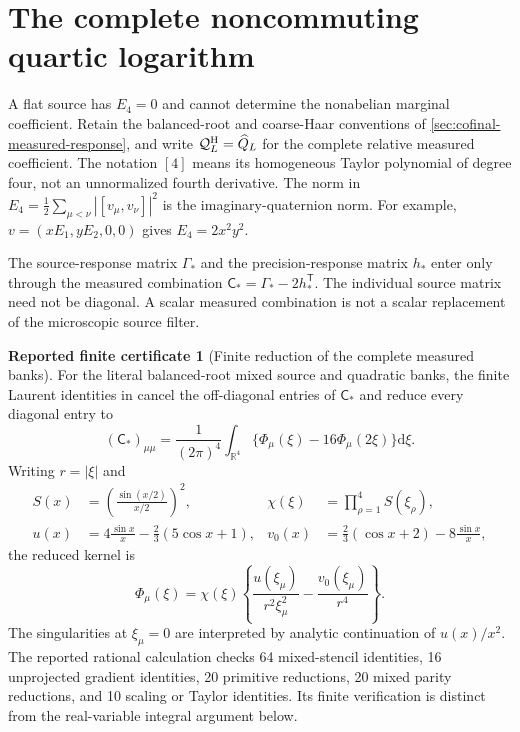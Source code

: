 \documentclass[11pt,oneside,openany]{book}
\theoremstyle{definition}
\newtheorem{certificate}[certificate]{Reported finite certificate}
\theoremstyle{remark}
\newcommand{\R}{\mathbb R}
\newcommand{\dd}{\mathrm d}
\newcommand{\src}[2]{\cite[#2]{#1}}
\begin{document}
\section{The complete noncommuting quartic logarithm}
\label{sec:measured-quartic-log}
A flat source has $E_4=0$ and cannot determine the nonabelian marginal
coefficient. Retain the balanced-root and coarse-Haar conventions of
\cref{sec:cofinal-measured-response}, and write
$\mathcal Q_L^{\rm H}=\widehat Q_L$ for the complete relative measured
coefficient. The notation $[4]$ means its homogeneous Taylor polynomial
of degree four, not an unnormalized fourth derivative. The norm in
$E_4=\tfrac12\sum_{\mu<\nu}|[v_\mu,v_\nu]|^2$ is the imaginary-quaternion
norm. For example, $v=(xE_1,yE_2,0,0)$ gives $E_4=2x^2y^2$.

The source-response matrix $\Gamma_*$ and the precision-response
matrix $h_*$ enter only through the measured combination
$\mathsf C_*=\Gamma_*-2h_*^{\mathsf T}$. The individual source matrix
need not be diagonal. A scalar measured combination is not a scalar
replacement of the microscopic source filter.

\begin{certificate}[Finite reduction of the complete measured banks]
\label{cert:measured-quartic-bank}
For the literal balanced-root mixed source and quadratic banks, the
finite Laurent identities in \src{F14}{V28--V30} cancel the
 off-diagonal entries of $\mathsf C_*$ and reduce every diagonal entry to
\begin{equation}
 (\mathsf C_*)_{\mu\mu}=
 \frac1{(2\pi)^4}\int_{\R^4}
                 \{\Phi_\mu(\xi)-16\Phi_\mu(2\xi)\}\dd\xi.
 \label{eq:quartic-flux-reduction}
\end{equation}
Writing $r=|\xi|$ and
\begin{align*}
 S(x)&=\left(\frac{\sin(x/2)}{x/2}\right)^2,&
 \chi(\xi)&=\prod_{\rho=1}^4S(\xi_\rho),\\
 u(x)&=4\frac{\sin x}{x}-\tfrac23(5\cos x+1),&
 v_0(x)&=\tfrac23(\cos x+2)-8\frac{\sin x}{x},
\end{align*}
the reduced kernel is
\[
 \Phi_\mu(\xi)=\chi(\xi)
 \left\{\frac{u(\xi_\mu)}{r^2\xi_\mu^2}
                         -\frac{v_0(\xi_\mu)}{r^4}\right\}.
\]
The singularities at $\xi_\mu=0$ are interpreted by analytic
continuation of $u(x)/x^2$. The reported rational calculation checks
64 mixed-stencil identities, 16 unprojected gradient identities,
20 primitive reductions, 20 mixed parity reductions, and 10 scaling
or Taylor identities. Its finite verification is distinct from the
real-variable integral argument below.
\end{certificate}
\end{document}
